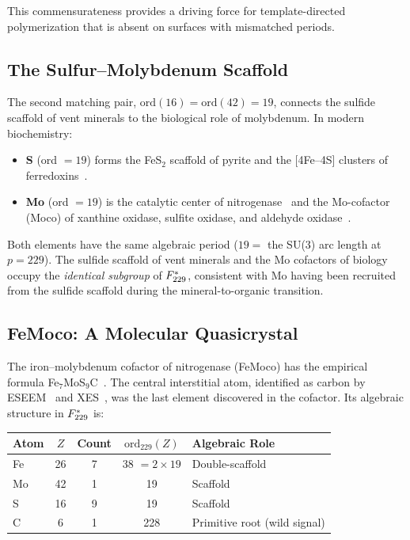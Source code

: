 This commensurateness provides a driving force for template-directed polymerization that is absent on surfaces with mismatched periods.

\subsection{The Sulfur--Molybdenum Scaffold}

The second matching pair, $\mathrm{ord}(16) = \mathrm{ord}(42) = 19$, connects the sulfide scaffold of vent minerals to the biological role of molybdenum. In modern biochemistry:
\begin{itemize}[noitemsep]
    \item \textbf{S} (ord $= 19$) forms the FeS$_2$ scaffold of pyrite and the [4Fe--4S] clusters of ferredoxins~\cite{Beinert97}.
    \item \textbf{Mo} (ord $= 19$) is the catalytic center of nitrogenase~\cite{Burgess96} and the Mo-cofactor (Moco) of xanthine oxidase, sulfite oxidase, and aldehyde oxidase~\cite{Hille96}.
\end{itemize}
Both elements have the same algebraic period ($19 =$ the SU(3) arc length at $p = 229$). The sulfide scaffold of vent minerals and the Mo cofactors of biology occupy the \emph{identical subgroup} of $F_{229}^*$, consistent with Mo having been recruited from the sulfide scaffold during the mineral-to-organic transition.

\subsection{FeMoco: A Molecular Quasicrystal}\label{sec:femoco}

The iron--molybdenum cofactor of nitrogenase (FeMoco) has the empirical formula Fe$_7$MoS$_9$C~\cite{Lancaster11, Spatzal11}. The central interstitial atom, identified as carbon by ESEEM~\cite{Lancaster11} and XES~\cite{Lancaster14}, was the last element discovered in the cofactor. Its algebraic structure in $F_{229}^*$ is:

\begin{center}
\begin{tabular}{@{}lcccl@{}}
\toprule
\textbf{Atom} & $Z$ & \textbf{Count} & $\mathrm{ord}_{229}(Z)$ & \textbf{Algebraic Role} \\
\midrule
Fe & 26 & 7 & 38 $= 2 \times 19$ & Double-scaffold \\
Mo & 42 & 1 & 19 & Scaffold \\
S  & 16 & 9 & 19 & Scaffold \\
C  & 6  & 1 & 228 & Primitive root (wild signal) \\
\bottomrule
\end{tabular}
\end{center}

